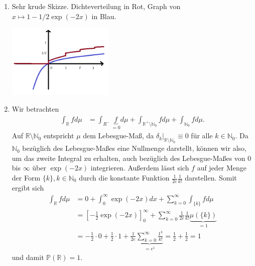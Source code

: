 \documentclass[a4paper]{article}
\begin{document}
\begin{enumerate}[label=(\alph*)]
	\item Sehr krude Skizze. Dichteverteilung in Rot, Graph von $x \mapsto 1 - 1/2 \exp(-2x)$ in Blau.
	      \begin{center}
		      \includegraphics[width=0.4\textwidth]{skizze.png}
	      \end{center}
	\item Wir betrachten
	      \begin{align*}
		      \int_{\mathds{R}} f d\mu & = \int_{R^-} \underbrace{f}_{=0} d\mu + \int_{\mathds{R}^+ \setminus \mathds{N}_0} f d\mu + \int_{\mathds{N}_0} f d\mu\text{.}
	      \end{align*}
	      Auf $\mathds{R} \setminus \mathds{N}_0$ entspricht $\mu$ dem Lebesgue-Maß, da $\delta_k|_{\mathds{R} \setminus \mathds{N}_0} \equiv 0$ für alle $k \in \mathds{N}_0$.
		  Da $\mathds{N}_0$ bezüglich des Lebesgue-Maßes eine Nullmenge darstellt, können wir also, um das zweite Integral zu erhalten, auch bezüglich des Lebesgue-Maßes von $0$ bis $\infty$ über $\exp(-2x)$ integrieren.
		  Außerdem lässt sich $f$ auf jeder Menge der Form $\{k\}, k \in \mathds{N}_0$ durch die konstante Funktion $\frac{1}{2e} \frac{1}{k!}$ darstellen.
		  Somit ergibt sich
	      \begin{align*}
		      \int_{\mathds{R}} f d\mu & = 0 + \int_{0}^{\infty} \exp(-2x) dx + \sum_{k=0}^{\infty} \int_{\{k\}} f d\mu                                                                       \\
		                       & = \left[-\frac{1}{2} \exp(-2x)\right]_0^\infty + \sum_{k=0}^{\infty} \frac{1}{2e} \frac{1}{k!} \underbrace{\mu(\{k\})}_{=1}                          \\
		                       & = -\frac{1}{2} \cdot 0 + \frac{1}{2} \cdot 1 + \frac{1}{2e} \underbrace{\sum_{k = 0}^{\infty} \frac{1^k}{k!}}_{=e^1} = \frac{1}{2} + \frac{1}{2} = 1
	      \end{align*}
	      und damit $\mathds{P}(\mathds{R}) = 1$.
\end{enumerate}
\end{document}
